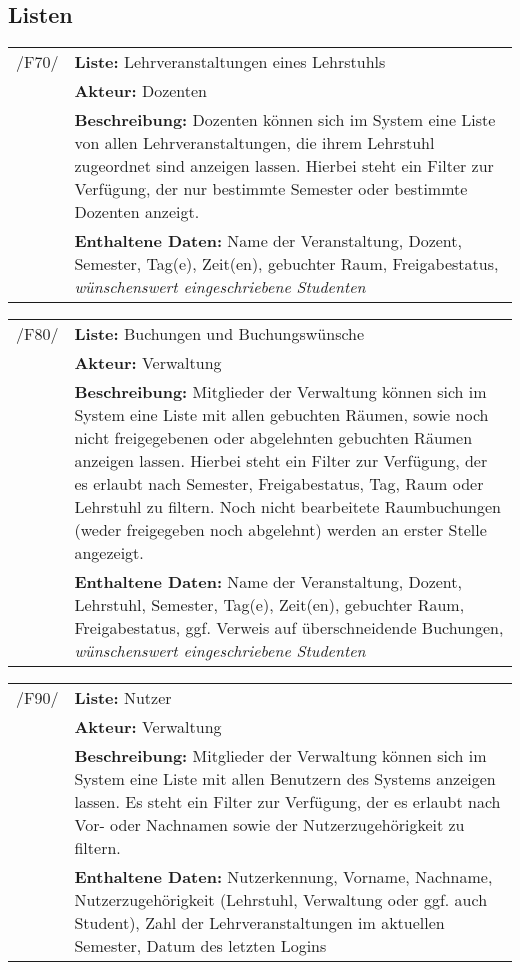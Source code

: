 \subsection{Listen}


\begin{tabular}{p{1.5cm}p{14.5cm}}


	 /F70/	& \textbf{Liste:} Lehrveranstaltungen eines Lehrstuhls \\
				& \textbf{Akteur:} Dozenten \\
				& \textbf{Beschreibung:} Dozenten können sich im System eine Liste von allen Lehrveranstaltungen, die ihrem Lehrstuhl zugeordnet sind anzeigen lassen. Hierbei steht ein Filter zur Verfügung, der nur bestimmte Semester oder bestimmte Dozenten anzeigt. \\
				& \textbf{Enthaltene Daten:} Name der Veranstaltung, Dozent, Semester, Tag(e), Zeit(en), gebuchter Raum, Freigabestatus, \textsl{wünschenswert eingeschriebene Studenten} \\[0.25cm]

\end{tabular}


\begin{tabular}{p{1.5cm}p{14.5cm}}
		
	 /F80/	& \textbf{Liste:} Buchungen und Buchungswünsche \\
				& \textbf{Akteur:} Verwaltung \\
				& \textbf{Beschreibung:} Mitglieder der Verwaltung können sich im System eine Liste mit allen gebuchten Räumen, sowie noch nicht freigegebenen oder abgelehnten gebuchten Räumen anzeigen lassen. Hierbei steht ein Filter zur Verfügung, der es erlaubt nach Semester, Freigabestatus, Tag, Raum oder Lehrstuhl zu filtern. Noch nicht bearbeitete Raumbuchungen (weder freigegeben noch abgelehnt) werden an erster Stelle angezeigt. \\
				& \textbf{Enthaltene Daten:} Name der Veranstaltung, Dozent, Lehrstuhl, Semester, Tag(e), Zeit(en), gebuchter Raum, Freigabestatus, ggf. Verweis auf überschneidende Buchungen, \textsl{wünschenswert eingeschriebene Studenten} \\[0.25cm]

\end{tabular}


\begin{tabular}{p{1.5cm}p{14.5cm}}
					
	 /F90/	& \textbf{Liste:} Nutzer \\
				& \textbf{Akteur:} Verwaltung \\
				& \textbf{Beschreibung:} Mitglieder der Verwaltung können sich im System eine Liste mit allen Benutzern des Systems anzeigen lassen. Es steht ein Filter zur Verfügung, der es erlaubt nach Vor- oder Nachnamen sowie der Nutzerzugehörigkeit zu filtern.\\
				& \textbf{Enthaltene Daten:} Nutzerkennung, Vorname, Nachname, Nutzerzugehörigkeit (Lehrstuhl, Verwaltung oder ggf. auch Student), Zahl der Lehrveranstaltungen im aktuellen Semester, Datum des letzten Logins \\[0.25cm]

\end{tabular}


